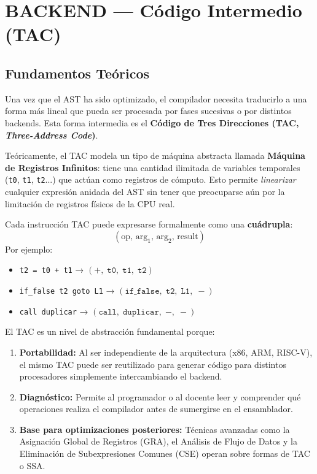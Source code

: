 \chapter{BACKEND — Código Intermedio (TAC)}

\section{Fundamentos Teóricos}

Una vez que el AST ha sido optimizado, el compilador necesita traducirlo a una forma más lineal que pueda ser procesada por fases sucesivas o por distintos backends. Esta forma intermedia es el \textbf{Código de Tres Direcciones (TAC, \textit{Three-Address Code})}.

Teóricamente, el TAC modela un tipo de máquina abstracta llamada \textbf{Máquina de Registros Infinitos}: tiene una cantidad ilimitada de variables temporales (\texttt{t0}, \texttt{t1}, \texttt{t2}...) que actúan como registros de cómputo. Esto permite \textit{linearizar} cualquier expresión anidada del AST sin tener que preocuparse aún por la limitación de registros físicos de la CPU real.

Cada instrucción TAC puede expresarse formalmente como una \textbf{cuádrupla}:
\[ (\mathrm{op},\, \mathrm{arg_1},\, \mathrm{arg_2},\, \mathrm{result}) \]
Por ejemplo:
\begin{itemize}
    \item \texttt{t2 = t0 + t1} → $(\texttt{+},\; \texttt{t0},\; \texttt{t1},\; \texttt{t2})$
    \item \texttt{if\_false t2 goto L1} → $(\texttt{if\_false},\; \texttt{t2},\; \texttt{L1},\; -)$
    \item \texttt{call duplicar} → $(\texttt{call},\; \texttt{duplicar},\; -,\; -)$
\end{itemize}

\begin{infobox}
El TAC es un nivel de abstracción fundamental porque:
\begin{enumerate}
    \item \textbf{Portabilidad:} Al ser independiente de la arquitectura (x86, ARM, RISC-V), el mismo TAC puede ser reutilizado para generar código para distintos procesadores simplemente intercambiando el backend.
    \item \textbf{Diagnóstico:} Permite al programador o al docente leer y comprender qué operaciones realiza el compilador antes de sumergirse en el ensamblador.
    \item \textbf{Base para optimizaciones posteriores:} Técnicas avanzadas como la Asignación Global de Registros (GRA), el Análisis de Flujo de Datos y la Eliminación de Subexpresiones Comunes (CSE) operan sobre formas de TAC o SSA.
\end{enumerate}
\end{infobox}


